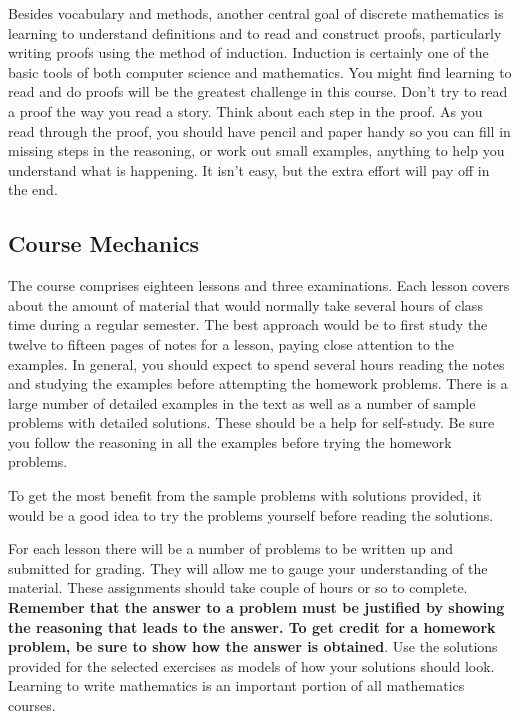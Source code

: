 \documentclass[11pt]{amsart}
\begin{document}
Besides vocabulary and methods, another central goal of discrete
mathematics is learning to understand definitions and to read and construct proofs, particularly
writing proofs using the method of induction. Induction is certainly one of
the basic tools of both computer science and mathematics. You might find
learning to read and do proofs will be the greatest challenge in this course.
Don't try to read a proof the way you read a story.  Think about each step
in the proof.  As you read through the proof, you should have pencil and
paper handy so you can fill in missing steps in the reasoning, or work out
small examples, anything to help you understand what is happening. It isn't
easy, but the extra effort will pay off in the end.

\subsection{Course Mechanics}
The course comprises eighteen lessons and three examinations.
 Each lesson covers about the
amount of material that would normally take several hours of  class time during
a regular semester. The best approach would
 be to first study the twelve to fifteen pages of notes for a lesson, paying close attention to the examples.
 In general, you should expect
to spend several hours reading the notes and studying the examples
before attempting the homework problems.  There is a  large number of detailed examples in the text as well as a number of sample problems with detailed solutions. These 
should be a help 
for self{-}study.  Be sure you follow the reasoning in all the examples
before trying the homework problems.

To get the most benefit from the sample
problems with solutions provided, it would be a good idea to try the problems
yourself before reading the solutions.

For each lesson there will be a number of problems to be written up and submitted for grading. They will
allow me to gauge your understanding of the material.   These assignments  
should take couple of hours or so to complete. {\bf Remember that the
answer to a problem must be justified by showing the reasoning that leads
to the answer. To get credit for a homework problem, be sure to show how
the answer is obtained}. Use the solutions provided for  the selected exercises as models of
how your solutions should look. Learning to write mathematics is an important
portion of all mathematics courses. 
\end{document}

